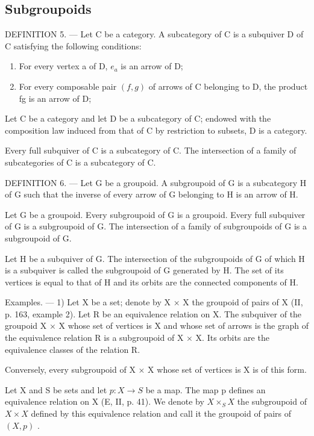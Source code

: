 \subsection{Subgroupoids}

DEFINITION 5. --- Let C be a category. A subcategory of C is a subquiver D of C satisfying the following conditions:

\begin{enumerate}
\def\labelenumi{(\roman{enumi})}
\item
  For every vertex a of D, \(e_a\) is an arrow of D;
\item
  For every composable pair \((f,g)\) of arrows of C belonging to D, the product fg is an arrow of D;
\end{enumerate}

Let C be a category and let D be a subcategory of C; endowed with the composition law induced from that of C by restriction to subsets, D is a category.

Every full subquiver of C is a subcategory of C. The intersection of a family of subcategories of C is a subcategory of C.

DEFINITION 6. --- Let G be a groupoid. A subgroupoid of G is a subcategory H of G such that the inverse of every arrow of G belonging to H is an arrow of H.

Let G be a groupoid. Every subgroupoid of G is a groupoid. Every full subquiver of G is a subgroupoid of G. The intersection of a family of subgroupoids of G is a subgroupoid of G.

Let H be a subquiver of G. The intersection of the subgroupoids of G of which H is a subquiver is called the subgroupoid of G generated by H. The set of its vertices is equal to that of H and its orbits are the connected components of H.

Examples. --- 1) Let X be a set; denote by X × X the groupoid of pairs of X (II, p. 163, example 2). Let R be an equivalence relation on X. The subquiver of the groupoid X × X whose set of vertices is X and whose set of arrows is the graph of the equivalence relation R is a subgroupoid of X × X. Its orbits are the equivalence classes of the relation R.

Conversely, every subgroupoid of X × X whose set of vertices is X is of this form.

Let X and S be sets and let \(p: X \rightarrow S\) be a map. The map p defines an equivalence relation on X (E, II, p. 41). We denote by \(X \times_{S} X\) the subgroupoid of \(X \times X\) defined by this equivalence relation and call it the groupoid of pairs of \((X, p)\) .

